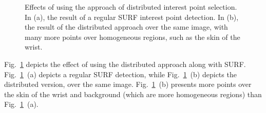 \begin{figure}[!t]
\centerline{
    \hfil
}
\caption{Effects of using the approach of distributed interest point selection.
In (a), the result of a regular SURF interest point detection.
In (b), the result of the distributed approach over the same image, with many more points over homogeneous regions, such as the skin of the wrist.}
\label{fig:disitributed_kp}
\end{figure}

Fig.~\ref{fig:disitributed_kp} depicts the effect of using the distributed approach along with SURF.
Fig.~\ref{fig:disitributed_kp}~(a) depicts a regular SURF detection, while Fig.~\ref{fig:disitributed_kp}~(b) depicts the distributed version, over the same image.
Fig.~\ref{fig:disitributed_kp}~(b) presents more points over the skin of the wrist and background (which are more homogeneous regions) than Fig.~\ref{fig:disitributed_kp}~(a).


\vspace{0.2cm} 
\subsubsection{}
\label{sec:prop_indxing}

